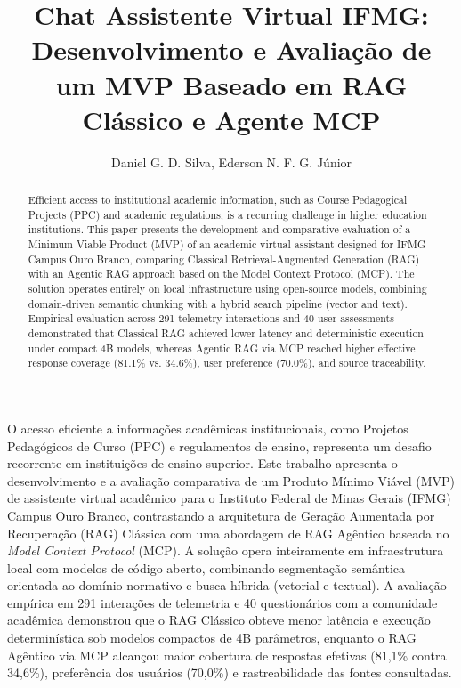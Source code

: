 \documentclass[12pt]{article}
\title{Chat Assistente Virtual IFMG: Desenvolvimento e Avaliação de um MVP Baseado em RAG Clássico e Agente MCP}
\author{Daniel G. D. Silva\inst{1}, Ederson N. F. G. Júnior\inst{1}}
\begin{document}
\maketitle


\begin{abstract}
 Efficient access to institutional academic information, such as Course Pedagogical Projects (PPC) and academic regulations, is a recurring challenge in higher education institutions. This paper presents the development and comparative evaluation of a Minimum Viable Product (MVP) of an academic virtual assistant designed for IFMG Campus Ouro Branco, comparing Classical Retrieval-Augmented Generation (RAG) with an Agentic RAG approach based on the Model Context Protocol (MCP). The solution operates entirely on local infrastructure using open-source models, combining domain-driven semantic chunking with a hybrid search pipeline (vector and text). Empirical evaluation across 291 telemetry interactions and 40 user assessments demonstrated that Classical RAG achieved lower latency and deterministic execution under compact 4B models, whereas Agentic RAG via MCP reached higher effective response coverage (81.1\% vs. 34.6\%), user preference (70.0\%), and source traceability.
\end{abstract}

\begin{resumo}
 O acesso eficiente a informações acadêmicas institucionais, como Projetos Pedagógicos de Curso (PPC) e regulamentos de ensino, representa um desafio recorrente em instituições de ensino superior. Este trabalho apresenta o desenvolvimento e a avaliação comparativa de um Produto Mínimo Viável (MVP) de assistente virtual acadêmico para o Instituto Federal de Minas Gerais (IFMG) Campus Ouro Branco, contrastando a arquitetura de Geração Aumentada por Recuperação (RAG) Clássica com uma abordagem de RAG Agêntico baseada no \textit{Model Context Protocol} (MCP). A solução opera inteiramente em infraestrutura local com modelos de código aberto, combinando segmentação semântica orientada ao domínio normativo e busca híbrida (vetorial e textual). A avaliação empírica em 291 interações de telemetria e 40 questionários com a comunidade acadêmica demonstrou que o RAG Clássico obteve menor latência e execução determinística sob modelos compactos de 4B parâmetros, enquanto o RAG Agêntico via MCP alcançou maior cobertura de respostas efetivas (81,1\% contra 34,6\%), preferência dos usuários (70,0\%) e rastreabilidade das fontes consultadas.
\end{resumo} 
\end{document}
